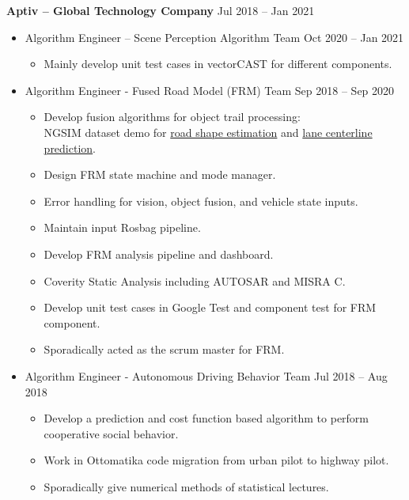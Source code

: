 \documentclass[a4paper,10pt,dvipdfmx]{article}
\def\CC{{C\nolinebreak[4]\hspace{-.05em}\raisebox{.4ex}{\tiny\bf ++}}}
\begin{document}
\textbf{Aptiv -- Global Technology Company} \hfill Jul 2018 -- Jan 2021
\begin{itemize}[noitemsep,nolistsep]
	\item[] Algorithm Engineer -- Scene Perception Algorithm Team \hfill Oct 2020 -- Jan 2021
    \begin{itemize}[noitemsep,nolistsep]
      \item Mainly develop unit test cases in vectorCAST for different components.
    \end{itemize}
  \item[] Algorithm Engineer - Fused Road Model (FRM) Team \hfill Sep 2018 -- Sep 2020
    \begin{itemize}[noitemsep,nolistsep]
      \item Develop fusion algorithms for object trail processing:\\
        NGSIM dataset demo for \href{https://youtu.be/nBhEnkIcLKs}{road shape estimation} and \href{https://youtu.be/2v-jDRaczJs}{lane centerline prediction}.
      \item Design FRM state machine and mode manager.
      \item Error handling for vision, object fusion, and vehicle state inputs.
      \item Maintain input Rosbag pipeline.
      \item Develop FRM analysis pipeline and dashboard.
      \item Coverity Static Analysis including AUTOSAR and MISRA \CC.
      \item Develop unit test cases in Google Test and component test for FRM component.
      \item Sporadically acted as the scrum master for FRM.
    \end{itemize}
  \item[] Algorithm Engineer - Autonomous Driving Behavior Team \hfill Jul 2018 -- Aug 2018
    \begin{itemize}[noitemsep,nolistsep]
      \item Develop a prediction and cost function based algorithm to perform cooperative social behavior.
      \item Work in Ottomatika code migration from urban pilot to highway pilot.
      \item Sporadically give numerical methods of statistical lectures.\\
    \end{itemize}
\end{itemize}
\end{document}
